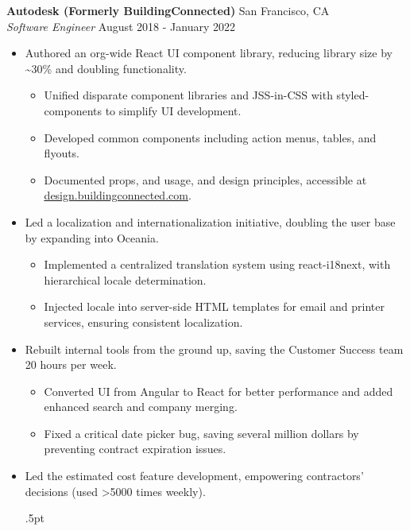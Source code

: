 \documentclass[a4paper]{article}
\begin{document}
\textbf{Autodesk (Formerly BuildingConnected)} \hfill San Francisco, CA\\
\textit{Software Engineer} \hfill August 2018 - January 2022\\
\vspace{-1mm}
\begin{itemize} \itemsep .5pt
    \item Authored an org-wide React UI component library, reducing library size by \textasciitilde{}30\% and doubling functionality.
    \begin{itemize} \itemsep .5pt
        \item Unified disparate component libraries and JSS-in-CSS with styled-components to simplify UI development.
        \item Developed common components including action menus, tables, and flyouts.
        \item Documented props, and usage, and design principles, accessible at \href{https://design.buildingconnected.com/}{\underline{design.buildingconnected.com}}.
        \end{itemize}
    \item Led a localization and internationalization initiative, doubling the user base by expanding into Oceania.
    \begin{itemize} \itemsep .5pt
            \item Implemented a centralized translation system using react-i18next, with hierarchical locale determination.
            \item Injected locale into server-side HTML templates for email and printer services, ensuring consistent localization.  
        \end{itemize}
    \item Rebuilt internal tools from the ground up, saving the Customer Success team 20 hours per week.
    \begin{itemize} \itemsep .5pt
            \item Converted UI from Angular to React for better performance and added enhanced search and company merging.
            \item Fixed a critical date picker bug, saving several million dollars by preventing contract expiration issues.
        \end{itemize}
    \item Led the estimated cost feature development, empowering contractors' decisions (used >5000 times weekly).
    \begin{itemize} \itemsep .5pt

\end{itemize}
\end{itemize}
\end{document}
